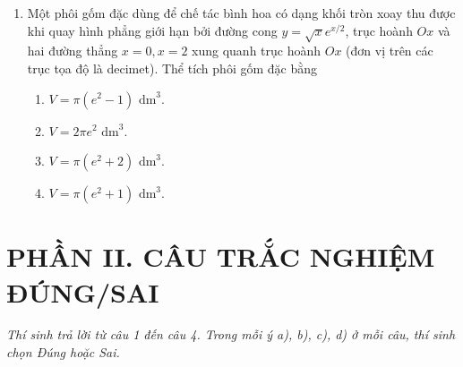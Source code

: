 \documentclass[12pt,a4paper]{article}
\begin{document}
\begin{enumerate}[label=\textbf{Câu \arabic*:}, leftmargin=*]
\item
\begin{minipage}[t]{\linewidth} 
Một phôi gốm đặc dùng để chế tác bình hoa có dạng khối tròn xoay thu được khi quay hình phẳng giới hạn bởi đường cong $y = \sqrt{x} e^{x/2}$, trục hoành $Ox$ và hai đường thẳng $x = 0, x = 2$ xung quanh trục hoành $Ox$ (đơn vị trên các trục tọa độ là decimet). Thể tích phôi gốm đặc bằng
\begin{enumerate}[label=\Alph*., itemsep=0pt, topsep=3pt, parsep=0pt]
    \item $V = \pi(e^2 - 1)\text{ dm}^3$.
    \item $V = 2\pi e^2\text{ dm}^3$.
    \item $V = \pi(e^2 + 2)\text{ dm}^3$.
    \item $V = \pi(e^2 + 1)\text{ dm}^3$.
\end{enumerate}
\end{minipage}

\end{enumerate}

\newpage
\section*{PHẦN II. CÂU TRẮC NGHIỆM ĐÚNG/SAI}
\textit{Thí sinh trả lời từ câu 1 đến câu 4. Trong mỗi ý a), b), c), d) ở mỗi câu, thí sinh chọn Đúng hoặc Sai.}
\end{document}

